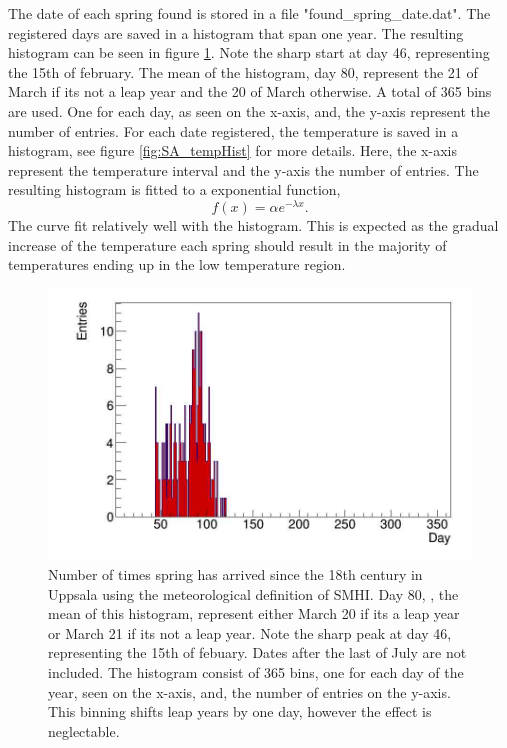 \documentclass[a4paper,12pt]{article}
\begin{document}
The date of each spring found is stored in a file 
"found\_spring\_date.dat". The registered days are saved in a histogram 
that span one year. The resulting histogram can be seen in figure 
\ref{fig:SA_dayHist}. Note the sharp start at day 46, representing the 
15th of february. The mean of the histogram, day 80, represent the 21 
of March if its not a leap year and the 20 of March otherwise. A total 
of 365 bins are used. One for each day, as seen on the x-axis, and, the 
y-axis represent the number of entries. For each date registered, the 
temperature is saved in a histogram, see figure \ref{fig:SA_tempHist} 
for more details. Here, the x-axis represent the temperature interval 
and the y-axis the number of entries. The resulting histogram is fitted 
to a exponential function,
\begin{equation}
	f(x)=\alpha e^{-\lambda x}.\label{eq:SA_fitfunc}
\end{equation}
The curve fit relatively well with the histogram. This is expected as 
the gradual increase of the temperature each spring should result in 
the majority of temperatures ending up in the low temperature region.
\begin{figure}[htb]
	\centering
	\includegraphics[scale=.4]{../Code/springArrive_dayHist.jpg}
	\caption{Number of times spring has arrived since the 18th century 
	in Uppsala using the meteorological definition of SMHI. Day 80, 
	, the mean of this histogram, represent either March 20 if its a 
	leap year or March 21 if its not a leap year. Note the sharp peak at 
	day 46, representing the 15th of febuary. Dates after the last of July  
	are not included. The histogram consist of 365 bins, one for each day 
	of the year, seen on the x-axis, and, the number of entries on the 
	y-axis. This binning shifts leap years by one day, however the 
	effect is neglectable.}
	\label{fig:SA_dayHist}
\end{figure}
\end{document}
